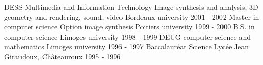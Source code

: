 \begin{cvhonors}
  \cvhonor
    {DESS Multimedia and Information Technology}
 	{Image synthesis and analysis, 3D geometry and rendering, sound, video}
    {Bordeaux university}
    {2001 - 2002}
  \cvhonor
    {Master in computer science}
    {Option image synthesis}
    {Poitiers university}
    {1999 - 2000}
  \cvhonor
    {B.S. in computer science}
    {}
    {Limoges university}
    {1998 - 1999}
  \cvhonor
    {DEUG computer science and mathematics}
    {}
    {Limoges university}
    {1996 - 1997}
  \cvhonor
    {Baccalauréat Science}
    {}
    {Lycée Jean Giraudoux, Châteauroux}
    {1995 - 1996}
    {}
\end{cvhonors}
